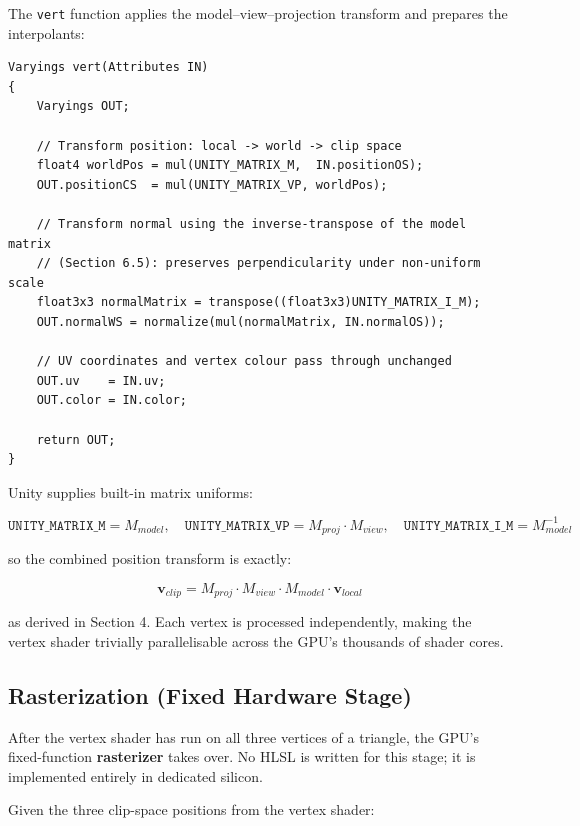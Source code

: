 \documentclass[11pt]{article}
\begin{document}
The \texttt{vert} function applies the model--view--projection transform and prepares the interpolants:

\begin{lstlisting}
Varyings vert(Attributes IN)
{
    Varyings OUT;

    // Transform position: local -> world -> clip space
    float4 worldPos = mul(UNITY_MATRIX_M,  IN.positionOS);
    OUT.positionCS  = mul(UNITY_MATRIX_VP, worldPos);

    // Transform normal using the inverse-transpose of the model matrix
    // (Section 6.5): preserves perpendicularity under non-uniform scale
    float3x3 normalMatrix = transpose((float3x3)UNITY_MATRIX_I_M);
    OUT.normalWS = normalize(mul(normalMatrix, IN.normalOS));

    // UV coordinates and vertex colour pass through unchanged
    OUT.uv    = IN.uv;
    OUT.color = IN.color;

    return OUT;
}
\end{lstlisting}

Unity supplies built-in matrix uniforms:

\begin{equation}
    \texttt{UNITY\_MATRIX\_M} = M_{model}, \quad
    \texttt{UNITY\_MATRIX\_VP} = M_{proj} \cdot M_{view}, \quad
    \texttt{UNITY\_MATRIX\_I\_M} = M_{model}^{-1}
\end{equation}

so the combined position transform is exactly:

\begin{equation}
    \mathbf{v}_{clip} = M_{proj} \cdot M_{view} \cdot M_{model} \cdot \mathbf{v}_{local}
\end{equation}

as derived in Section 4. Each vertex is processed independently, making the vertex shader trivially parallelisable across the GPU's thousands of shader cores.


\subsection{Rasterization (Fixed Hardware Stage)}

After the vertex shader has run on all three vertices of a triangle, the GPU's fixed-function \textbf{rasterizer} takes over. No HLSL is written for this stage; it is implemented entirely in dedicated silicon.

Given the three clip-space positions from the vertex shader:
\end{document}
